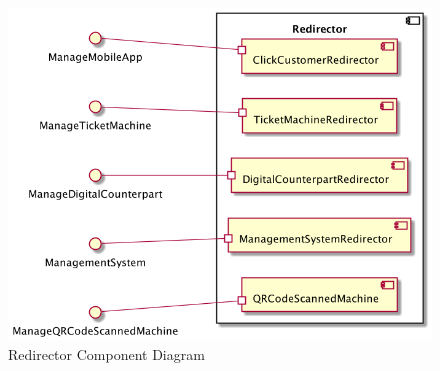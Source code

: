 \documentclass[a4paper,12pt]{report}
\begin{document}
\begin{figure}[H]
	\centering
	\includegraphics[scale=0.2]{component_diagram_redirector}
	\caption{Redirector Component Diagram}
	\centering
	\label{fig:component_diagram_redirector}
\end{figure}
\end{document}
